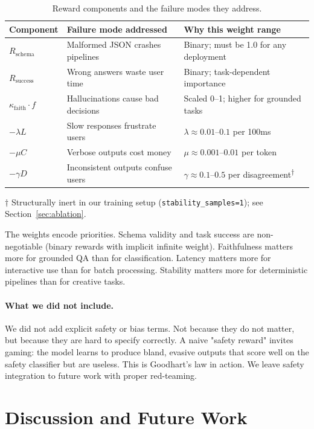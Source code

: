 \documentclass[11pt]{article}
\begin{document}
\begin{table}[t]
\centering
\caption{Reward components and the failure modes they address.}
\label{tab:reward-rationale}
\begin{tabular}{@{}lp{5cm}p{5cm}@{}}
\toprule
\textbf{Component} & \textbf{Failure mode addressed} & \textbf{Why this weight range} \\
\midrule
$R_{\text{schema}}$ & Malformed JSON crashes pipelines & Binary; must be 1.0 for any deployment \\
$R_{\text{success}}$ & Wrong answers waste user time & Binary; task-dependent importance \\
$\kappa_{\text{faith}} \cdot f$ & Hallucinations cause bad decisions & Scaled 0--1; higher for grounded tasks \\
$-\lambda L$ & Slow responses frustrate users & $\lambda \approx 0.01$--$0.1$ per 100ms \\
$-\mu C$ & Verbose outputs cost money & $\mu \approx 0.001$--$0.01$ per token \\
$-\gamma D$ & Inconsistent outputs confuse users & $\gamma \approx 0.1$--$0.5$ per disagreement\textsuperscript{$\dagger$} \\
\bottomrule
\end{tabular}
\par\smallskip
{\footnotesize $\dagger$ Structurally inert in our training setup (\texttt{stability\_samples=1}); see Section~\ref{sec:ablation}.}
\end{table}

The weights encode priorities.
Schema validity and task success are non-negotiable (binary rewards with implicit infinite weight).
Faithfulness matters more for grounded QA than for classification.
Latency matters more for interactive use than for batch processing.
Stability matters more for deterministic pipelines than for creative tasks.

\paragraph{What we did not include.}
We did not add explicit safety or bias terms.
Not because they do not matter, but because they are hard to specify correctly.
A naive "safety reward" invites gaming: the model learns to produce bland, evasive outputs that score well on the safety classifier but are useless.
This is Goodhart's law in action.
We leave safety integration to future work with proper red-teaming.

\section{Discussion and Future Work}
\label{sec:discussion}
\end{document}
